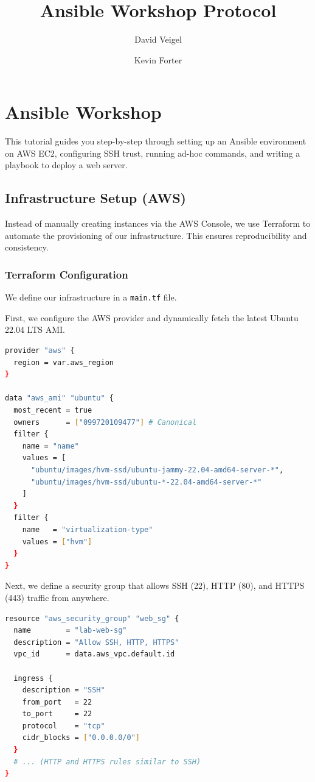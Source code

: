 \documentclass[BMR,Seminar,ngerman,IEEE]{twbook}
\title{Ansible Workshop Protocol}
\author{David Veigel \and Kevin Forter}
\begin{document}
\maketitle

\onecolumn
\newpage

\chapter{Ansible Workshop}
This tutorial guides you step-by-step through setting up an Ansible environment on AWS EC2, configuring SSH trust, running ad-hoc commands, and writing a playbook to deploy a web server.

\section{Infrastructure Setup (AWS)}
Instead of manually creating instances via the AWS Console, we use Terraform to automate the provisioning of our infrastructure. This ensures reproducibility and consistency.

\subsection{Terraform Configuration}
We define our infrastructure in a \texttt{main.tf} file.

First, we configure the AWS provider and dynamically fetch the latest Ubuntu 22.04 LTS AMI.
\begin{lstlisting}[language=bash]
provider "aws" {
  region = var.aws_region
}

data "aws_ami" "ubuntu" {
  most_recent = true
  owners      = ["099720109477"] # Canonical
  filter {
    name = "name"
    values = [
      "ubuntu/images/hvm-ssd/ubuntu-jammy-22.04-amd64-server-*",
      "ubuntu/images/hvm-ssd/ubuntu-*-22.04-amd64-server-*"
    ]
  }
  filter {
    name   = "virtualization-type"
    values = ["hvm"]
  }
}
\end{lstlisting}

Next, we define a security group that allows SSH (22), HTTP (80), and HTTPS (443) traffic from anywhere.
\begin{lstlisting}[language=bash]
resource "aws_security_group" "web_sg" {
  name        = "lab-web-sg"
  description = "Allow SSH, HTTP, HTTPS"
  vpc_id      = data.aws_vpc.default.id

  ingress {
    description = "SSH"
    from_port   = 22
    to_port     = 22
    protocol    = "tcp"
    cidr_blocks = ["0.0.0.0/0"]
  }
  # ... (HTTP and HTTPS rules similar to SSH)
}
\end{lstlisting}
\end{document}

